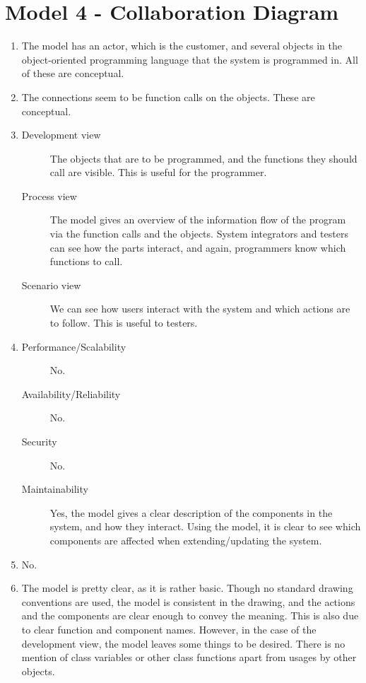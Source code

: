\section{Model 4 - Collaboration Diagram}
\begin{enumerate}
	\item The model has an actor, which is the customer, and several objects in the object-oriented programming language that the system is programmed in.
	All of these are conceptual.
	
	\item The connections seem to be function calls on the objects. These are conceptual.
	
	\item
	\begin{description}
		\item[Development view] The objects that are to be programmed, and the functions they should call are visible. This is useful for the programmer.
		\item[Process view] The model gives an overview of the information flow of the program via the function calls and the objects.
		System integrators and testers can see how the parts interact, and again, programmers know which functions to call.
        \item[Scenario view] We can see how users interact with the system and which actions are to follow. This is useful to testers.
	\end{description}
	
	\item
	\begin{description}
		\item[Performance/Scalability] No.
		\item[Availability/Reliability] No.
		\item[Security] No.
		\item[Maintainability] Yes, the model gives a clear description of the components in the system, and how they interact.
		Using the model, it is clear to see which components are affected when extending/updating the system.
	\end{description}
	
	\item No.
	
	\item The model is pretty clear, as it is rather basic.
	Though no standard drawing conventions are used, the model is consistent in the drawing, and the actions and the components are clear enough to convey the meaning.
	This is also due to clear function and component names.
	However, in the case of the development view, the model leaves some things to be desired.
	There is no mention of class variables or other class functions apart from usages by other objects.
\end{enumerate} 